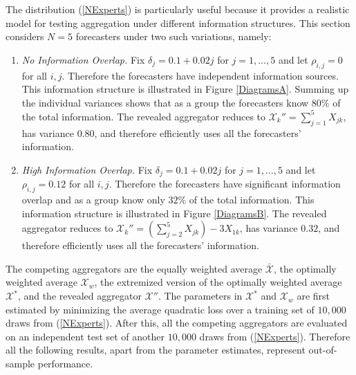 \documentclass[11pt]{article}
\theoremstyle{definition}
\theoremstyle{definition}
\begin{document}
The distribution (\ref{NExperts}) is particularly useful because it provides a realistic model for testing aggregation under different information structures. This section considers $N = 5$ forecasters under two such variations, namely:
\begin{enumerate}
\item[] \textit{No Information Overlap.}  Fix $\delta_j = 0.1 + 0.02j$ for $j = 1, \dots, 5$ and let $\rho_{i,j} = 0$ for all $i,j$. Therefore the forecasters have independent information sources. This information structure is illustrated in Figure \ref{DiagramsA}. Summing up the individual variances shows that as a group the forecasters know $80\%$ of the total information. The revealed aggregator reduces to $\mathcal{X}_k'' = \sum_{j=1}^5 X_{jk}$, has variance $0.80$, and therefore efficiently uses all the forecasters' information.


\item[] \textit{High Information Overlap.} Fix $\delta_j = 0.1 + 0.02j$ for $j = 1, \dots, 5$ and let $\rho_{i,j} = 0.12$ for all $i,j$. Therefore the forecasters have significant information overlap and as a group know only $32\%$ of the total information. This information structure is illustrated in Figure \ref{DiagramsB}. The revealed aggregator reduces to $ \mathcal{X}_k'' = \left( \sum_{j=2}^5 X_{jk} \right) - 3X_{1k}$, has variance $0.32$, and therefore efficiently uses all the forecasters' information.
\end{enumerate}


The competing aggregators are the equally weighted average $\bar{\mathcal{X}}$, the optimally weighted average $\mathcal{X}_w$, the extremized version of the optimally weighted average $\mathcal{X}^*$, and the revealed aggregator $\mathcal{X}''$. The parameters in $\mathcal{X}^*$ and  $\mathcal{X}_w$ are first estimated by minimizing the average quadratic loss over a training set of $10,000$ draws from (\ref{NExperts}).  After this, all the competing aggregators are evaluated on an independent test set of another $10,000$ draws from (\ref{NExperts}). 
Therefore all the following results, apart from the parameter estimates, represent out-of-sample performance. 
\end{document}
